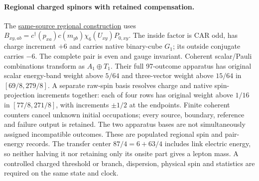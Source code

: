 \paragraph{Regional charged spinors with retained compensation.}
The \href{https://github.com/FloatingPragma/observer-patch-holography/blob/main/model/particle_primary_regional_fermion/PROOF.md}{same-source regional construction}
uses $B_{xy,ab}=c^\dagger(p_{xa})c(m_{yb})\chi_6(U_{xy})P_{0,xy}$.
The inside factor is CAR odd, has charge increment $+6$ and carries
native binary-cube $G_1$; its outside conjugate carries $-6$.
The complete pair is even and gauge invariant. Coherent scalar/Pauli
combinations transform as $A_1\oplus T_1$. Their full 97-outcome
apparatus has original scalar energy-band weight above $5/64$ and
three-vector weight above $15/64$ in $[69/8,279/8]$.
A separate raw-spin basis resolves charge and native spin-projection
increments together: each of four rows has original weight above
$1/16$ in $[77/8,271/8]$, with increments $\pm1/2$ at the endpoints.
Finite coherent counters cancel unknown initial occupations; every
source, boundary, reference and failure output is retained. The two
apparatus bases are not simultaneously assigned incompatible outcomes.
These are populated regional spin and pair-energy records. The transfer
center $87/4=6+63/4$ includes link electric energy, so neither halving it
nor retaining only its onsite part gives a lepton mass. A controlled
charged threshold or branch, dispersion, physical spin and statistics
are required on the same state and clock.


